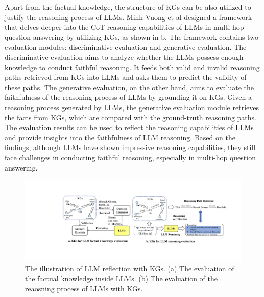 Apart from the factual knowledge, the structure of KGs can be also utilized to justify the reasoning process of LLMs. Minh-Vuong et al \cite{nguyen-etal-2024-direct} designed a framework that delves deeper into the CoT reasoning capabilities of LLMs in multi-hop question answering by utilizing KGs, as shown in b. The framework contains two evaluation modules: discriminative evaluation and generative evaluation. The discriminative evaluation aims to analyze whether the LLMs possess enough knowledge to conduct faithful reasoning. It feeds both valid and invalid reasoning paths retrieved from KGs into LLMs and asks them to predict the validity of these paths. The generative evaluation, on the other hand, aims to evaluate the faithfulness of the reasoning process of LLMs by grounding it on KGs. Given a reasoning process generated by LLMs, the generative evaluation module retrieves the facts from KGs, which are compared with the ground-truth reasoning paths. The evaluation results can be used to reflect the reasoning capabilities of LLMs and provide insights into the faithfulness of LLM reasoning. Based on the findings, although LLMs have shown impressive reasoning capabilities, they still face challenges in conducting faithful reasoning, especially in multi-hop question answering. 

\begin{figure}[htbp]
    \begin{center}
    \includegraphics[width=1\columnwidth]{submissions/CarlYang2024/figures/reflecting.pdf}
    \end{center}
    \caption{The illustration of LLM reflection with KGs. (a) The evaluation of the factual knowledge inside LLMs. (b) The evaluation of the reaosning process of LLMs with KGs.}
    \label{fig:reflecting}
\end{figure}